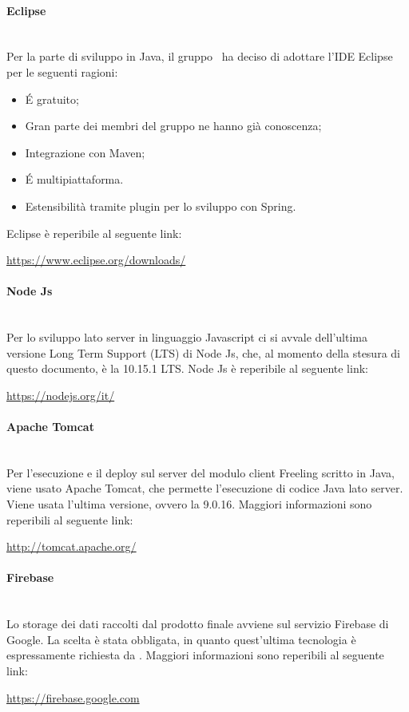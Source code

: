 \paragraph{Eclipse}\mbox{}\\
Per la parte di sviluppo in Java, il gruppo \gruppo \ ha deciso di adottare l'IDE Eclipse per le seguenti ragioni:
\begin{itemize}
	\item \'E gratuito;
	\item Gran parte dei membri del gruppo ne hanno già conoscenza;
	\item Integrazione con Maven;
	\item \'E multipiattaforma.
	\item Estensibilità tramite plugin per lo sviluppo con Spring.
\end{itemize}
Eclipse è reperibile al seguente link:\newline
\begin{center}
	\url{https://www.eclipse.org/downloads/}
\end{center}

\paragraph{Node Js}\mbox{}\\
Per lo sviluppo lato server in linguaggio Javascript ci si avvale dell'ultima versione Long Term Support (LTS) di Node Js, che, al momento della stesura di questo documento, è la 10.15.1 LTS.
Node Js è reperibile al seguente link:\newline
\begin{center}
	\url{https://nodejs.org/it/}
\end{center}

\paragraph{Apache Tomcat}\mbox{}\\
Per l'esecuzione e il deploy sul server del modulo client Freeling scritto in Java, viene usato Apache Tomcat, che permette l'esecuzione di codice Java lato server. Viene usata l'ultima versione, ovvero la 9.0.16.
Maggiori informazioni sono reperibili al seguente link:\newline
\begin{center}
	\url{http://tomcat.apache.org/}
\end{center}

\paragraph{Firebase}\mbox{}\\
Lo storage dei dati raccolti dal prodotto finale avviene sul servizio Firebase di Google. La scelta è stata obbligata, in quanto quest'ultima tecnologia è espressamente richiesta da \proponente .\newline
Maggiori informazioni sono reperibili al seguente link:\newline
\begin{center}
	\url{https://firebase.google.com}
\end{center}

